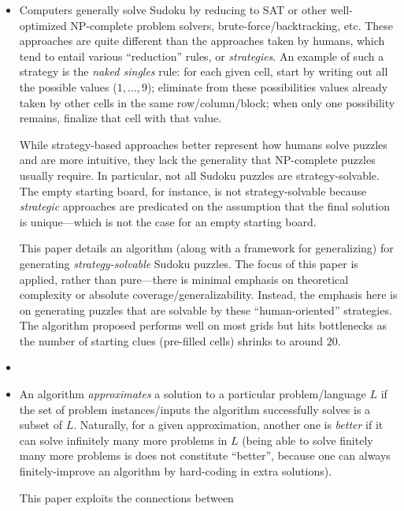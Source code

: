 \documentclass{extarticle}
\begin{document}
\begin{itemize}
  \item {}

    \begin{annotation}
      Computers generally solve Sudoku by reducing to SAT or other
      well-optimized NP-complete problem solvers, brute-force/backtracking,
      etc.  These approaches are quite different than the approaches taken by
      humans, which tend to entail various ``reduction'' rules, or
      \emph{strategies}.  An example of such a strategy is the \emph{naked
      singles} rule: for each given cell, start by writing out all the possible
      values (\(1, \dots, 9\)); eliminate from these possibilities values
      already taken by other cells in the same row/column/block; when only one
      possibility remains, finalize that cell with that value.

      While strategy-based approaches better represent how humans solve puzzles
      and are more intuitive, they lack the generality that NP-complete puzzles
      usually require.  In particular, not all Sudoku puzzles are
      strategy-solvable.  The empty starting board, for instance, is not
      strategy-solvable because \emph{strategic} approaches are predicated on
      the assumption that the final solution is unique---which is not the case
      for an empty starting board.

      This paper details an algorithm (along with a framework for generalizing)
      for generating \emph{strategy-solvable} Sudoku puzzles.  The focus of
      this paper is applied, rather than pure---there is minimal emphasis on
      theoretical complexity or absolute coverage/generalizability.  Instead,
      the emphasis here is on generating puzzles that are solvable by these
      ``human-oriented'' strategies.  The algorithm proposed performs well on
      most grids but hits bottlenecks as the number of starting clues
      (pre-filled cells) shrinks to around \(20\).
    \end{annotation}

  \item {}

  \item {}

    \begin{annotation}
      An algorithm \emph{approximates} a solution to a particular
      problem/language \(L\) if the set of problem instances/inputs the
      algorithm successfully solves is a subset of \(L\).  Naturally, for a
      given approximation, another one is \emph{better} if it can solve
      infinitely many more problems in \(L\) (being able to solve finitely many
      more problems is does not constitute ``better'', because one can always
      finitely-improve an algorithm by hard-coding in extra solutions).  

      This paper exploits the connections between 
    \end{annotation}

\end{itemize}
\end{document}
